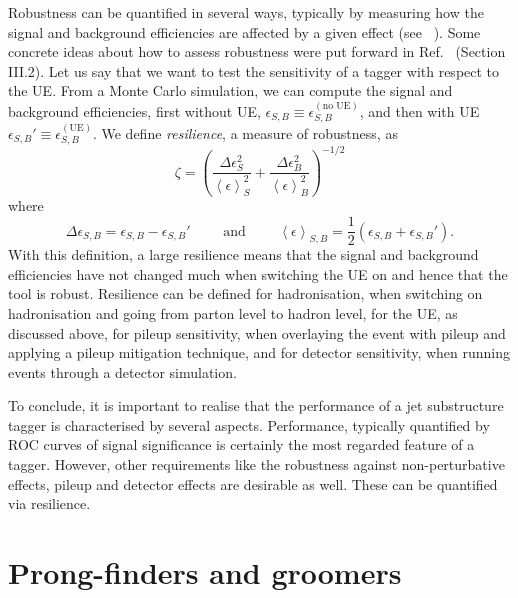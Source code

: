 Robustness can be quantified in several ways, typically by measuring
how the signal and background efficiencies are affected by a given
effect (see
\eg~\cite{Dasgupta:2016ktv,Salam:2016yht,Bendavid:2018nar}).
%
Some concrete ideas about how to assess robustness were put forward in
Ref.~\cite{Bendavid:2018nar} (Section III.2). Let us say that we want to
test the sensitivity of a tagger with respect to the UE. From a
Monte Carlo simulation, we can compute the signal and background
efficiencies, first without UE, $\epsilon_{S,B}\equiv\epsilon_{S,B}^{(\text{no UE})}$, and then
with UE $\epsilon_{S,B}'\equiv\epsilon_{S,B}^{(\text{UE})}$. We define {\it resilience}, a measure
of robustness, as
\begin{equation}\label{eq:resilience}
  \zeta = \left(
      \frac{\Delta\epsilon_{S}^2}{\left\langle\epsilon\right\rangle_{S}^2}
    + \frac{\Delta\epsilon_{B}^2}{\left\langle\epsilon\right\rangle_{B}^2}
  \right)^{-1/2}
\end{equation}
where
\begin{equation}
  \Delta \epsilon_{S,B}  =\epsilon_{S,B}-\epsilon_{S,B}'
  \qquad\text{ and }\qquad
\left\langle\epsilon\right\rangle_{S,B} 
     =\frac{1}{2}\left(\epsilon_{S,B}+\epsilon_{S,B}'\right).
\end{equation}
With this definition, a large resilience means that the signal and
background efficiencies have not changed much when switching the UE on
and hence that the tool is robust.
%
Resilience can be defined for hadronisation, \ie when switching on
hadronisation and going from parton level to hadron level, for the UE,
as discussed above, for pileup sensitivity, \ie when overlaying the
event with pileup and applying a pileup mitigation technique, and for
detector sensitivity, \ie when running events through a detector
simulation.

To conclude, it is important to realise that the performance of a jet
substructure tagger is characterised by several aspects. Performance,
typically quantified by ROC curves of signal significance is certainly
the most regarded feature of a tagger. However, other requirements
like the robustness against non-perturbative effects, pileup and
detector effects are desirable as well. These can be quantified \eg
via resilience.

\section{Prong-finders and groomers}\label{sec:tools-prong-finders-groomers}


